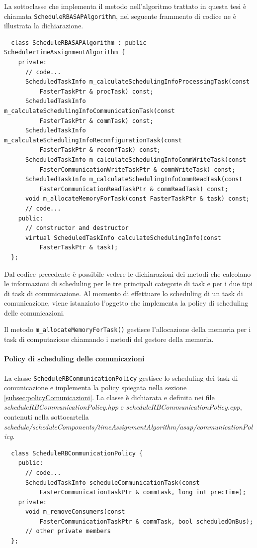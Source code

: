 La sottoclasse che implementa il metodo nell'algoritmo trattato in questa tesi 
è chiamata \verb+ScheduleRBASAPAlgorithm+, nel seguente frammento di codice ne 
è illustrata la dichiarazione.
\newline
\begin{verbatim}
  class ScheduleRBASAPAlgorithm : public SchedulerTimeAssignmentAlgorithm {
    private:
      // code...
      ScheduledTaskInfo m_calculateSchedulingInfoProcessingTask(const 
          FasterTaskPtr & procTask) const;
      ScheduledTaskInfo m_calculateSchedulingInfoCommunicationTask(const 
          FasterTaskPtr & commTask) const;
      ScheduledTaskInfo m_calculateSchedulingInfoReconfigurationTask(const 
          FasterTaskPtr & reconfTask) const;
      ScheduledTaskInfo m_calculateSchedulingInfoCommWriteTask(const 
          FasterCommunicationWriteTaskPtr & commWriteTask) const;
      ScheduledTaskInfo m_calculateSchedulingInfoCommReadTask(const 
          FasterCommunicationReadTaskPtr & commReadTask) const;
      void m_allocateMemoryForTask(const FasterTaskPtr & task) const;
      // code...
    public:
      // constructor and destructor
      virtual ScheduledTaskInfo calculateSchedulingInfo(const 
          FasterTaskPtr & task);
  };
\end{verbatim}
Dal codice precedente è possibile vedere le dichiarazioni dei metodi che 
calcolano le informazioni di scheduling per le tre principali categorie di 
task e per i due tipi di task di comunicazione. Al momento di effettuare lo 
scheduling di un task di comunicazione, viene istanziato l'oggetto che 
implementa la policy di scheduling delle comunicazioni.

Il metodo \verb+m_allocateMemoryForTask()+ gestisce l'allocazione della memoria 
per i task di computazione chiamando i metodi del gestore della memoria.

\paragraph{Policy di scheduling delle comunicazioni}
La classe \verb+ScheduleRBCommunicationPolicy+ gestisce lo scheduling dei task 
di comunicazione e implementa la policy spiegata nella sezione 
\ref{subsec:policyComunicazioni}. La classe è dichiarata e definita nei file 
\emph{scheduleRBCommunicationPolicy.hpp} e  \emph{scheduleRBCommunicationPolicy.cpp},
contenuti nella sottocartella  \emph{schedule/scheduleComponents/timeAssignmentAlgorithm/asap/communicationPolicy}.
\newline
\begin{verbatim}
  class ScheduleRBCommunicationPolicy {
    public:
      // code...
      ScheduledTaskInfo scheduleCommunicationTask(const
          FasterCommunicationTaskPtr & commTask, long int precTime);
    private:
      void m_removeConsumers(const
          FasterCommunicationTaskPtr & commTask, bool scheduledOnBus);
      // other private members
  };
\end{verbatim}

